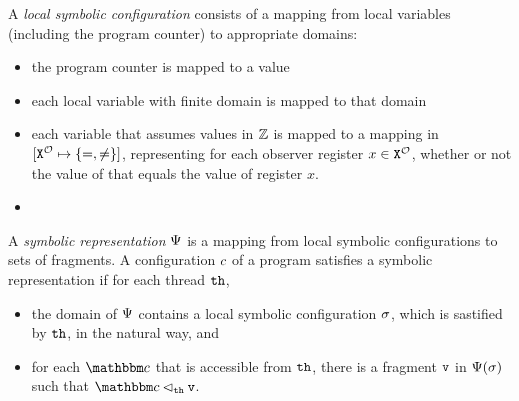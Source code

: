 A {\em local symbolic configuration} consists of a mapping from local variables
(including the program counter) to appropriate domains:
\begin{itemize}
\item the program counter is mapped to a value
\item each local variable with finite domain is mapped to that domain
\item each variable that assumes values in ${\mathbb Z}$ is mapped to
  a mapping in  $[{\tt X}^{{\mathcal O}} \mapsto{\left\{=,\neq\right\}}]$, representing for
  each observer register $x  \in {\tt X}^{{\mathcal O}}$, whether or not the value
  of that equals the value of register $x$.
\item {}
\end{itemize}
A {\em symbolic representation} $\Psi$ is a mapping from
local symbolic  configurations to sets of fragments.
A configuration $c$ of a program satisfies a symbolic representation
if for each thread ${\tt th}$, 
\begin{itemize}
\item the domain of $\Psi$ contains a local symbolic configuration
  $\sigma$, which is sastified by ${\tt th}$, in the
  natural way, and
\item for each $\cell$ that is accessible from ${\tt th}$, there is
  a fragment $\mathtt{v}$ in $\Psi(\sigma)$ such that
  $\cell \lhd_{\thread} \frag$.
\end{itemize}

